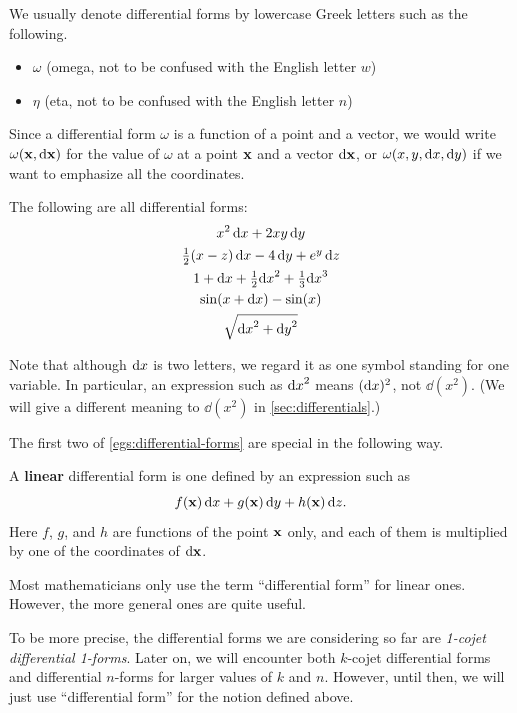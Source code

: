 \documentclass[12pt]{amsart}
\begin{document}
We usually denote differential forms by lowercase Greek letters such as the following.
\begin{itemize}
\item $\omega$ (omega, not to be confused with the English letter $w$)
\item $\eta$ (eta, not to be confused with the English letter $n$)
\end{itemize}
Since a differential form $\omega$ is a function of a point and a vector, we would write $\omega(\mathbf{x},{\mathrm{d} \mathbf{x}})$ for the value of $\omega$ at a point $\mathbf{x}$ and a vector ${\mathrm{d} \mathbf{x}}$, or $\omega(x,y,{\mathrm{d} x},{\mathrm{d} y})$ if we want to emphasize all the coordinates.

\begin{egs}\label{egs:differential-forms}
  The following are all differential forms:
  \begin{gather*}
    x^2 \,{\mathrm{d} x} + 2xy \, {\mathrm{d} y}\\
    \textstyle\frac{1}{2}({x-z}) \,{\mathrm{d} x} - 4\, {\mathrm{d} y} + e^y \,{\mathrm{d} z}\\
    1 + {\mathrm{d} x} + \textstyle\frac{1}{2} {\mathrm{d} x}^2 + \textstyle\frac{1}{3} {\mathrm{d} x}^3\\
    \sin(x + {\mathrm{d} x}) - \sin(x)\\
    \sqrt{{\mathrm{d} x}^2+{\mathrm{d} y}^2}
  \end{gather*}
\end{egs}

Note that although ${\mathrm{d} x}$ is two letters, we regard it as one symbol standing for one variable.
In particular, an expression such as ${\mathrm{d} x}^2$ means $({\mathrm{d} x})^2$, not $\dd(x^2)$.
(We will give a different meaning to $\dd(x^2)$ in \cref{sec:differentials}.)

The first two of \cref{egs:differential-forms} are special in the following way.

\begin{defn}
  A \textbf{linear} differential form is one defined by an expression such as
  \[ f(\mathbf{x}) \, {\mathrm{d} x} + g(\mathbf{x}) \, {\mathrm{d} y} + h(\mathbf{x}) \, {\mathrm{d} z}. \]
  Here $f$, $g$, and $h$ are functions of the point $\mathbf{x}$ only, and each of them is multiplied by one of the coordinates of ${\mathrm{d} \mathbf{x}}$.
\end{defn}

Most mathematicians only use the term ``differential form'' for linear ones.
However, the more general ones are quite useful.

\begin{adv}
  To be more precise, the differential forms we are considering so far are \emph{1-cojet differential 1-forms}.
  Later on, we will encounter both $k$-cojet differential forms and differential $n$-forms for larger values of $k$ and $n$.
  However, until then, we will just use ``differential form'' for the notion defined above.
\end{adv}
\end{document}
